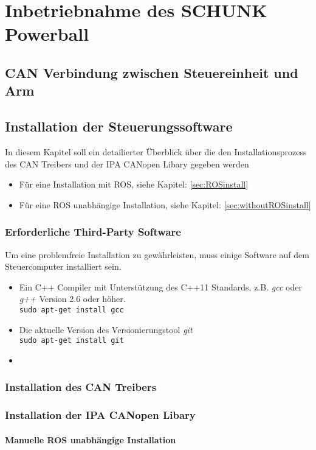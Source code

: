 \chapter{Inbetriebnahme des SCHUNK Powerball}
\label{sec:Inbetriebnahme}

\section{CAN Verbindung zwischen Steuereinheit und Arm}
\section{Installation der Steuerungssoftware}
In diesem Kapitel soll ein detailierter Überblick über die den Installationsprozess des CAN Treibers und der IPA CANopen Libary gegeben werden
\begin{itemize}
 	\item Für eine Installation mit ROS, siehe Kapitel: \ref{sec:ROSinstall}
    \item Für eine ROS unabhängige Installation, siehe Kapitel: \ref{sec:withoutROSinstall}

\end{itemize}
\subsection{Erforderliche Third-Party Software}
Um eine problemfreie Installation zu gewährleisten, muss einige Software auf dem Steuercomputer
installiert sein.
\begin{itemize}
	\item Ein C++ Compiler mit Unterstützung des C++11 Standards, z.B. \textit{gcc} 
	oder \textit{g++} Version 2.6 oder höher.\\
	\texttt{sudo apt-get install gcc}
	\item Die aktuelle Version des Versionierungstool \textit{git}\\
	\texttt{sudo apt-get install git}
	\item 

\end{itemize}


\subsection{Installation des CAN Treibers}
\subsection{Installation der IPA CANopen Libary}
\subsubsection{Manuelle ROS unabhängige Installation}
